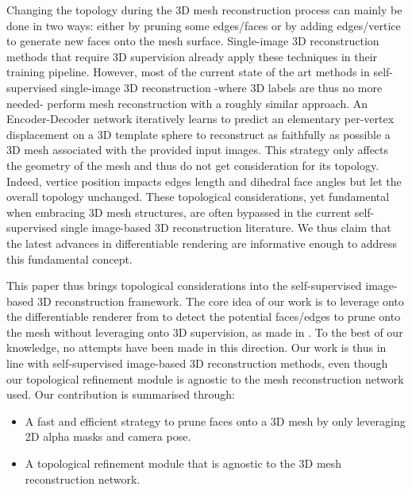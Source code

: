 Changing the topology during the 3D mesh reconstruction process can mainly be done in two ways: either by pruning some edges/faces or by adding edges/vertice to generate new faces onto the mesh surface. Single-image 3D reconstruction methods that require 3D supervision already apply these techniques in their training pipeline\citep{pan2019deep,nie2020total3dunderstanding,smith2019geometrics}. However, most of the current state of the art methods in self-supervised single-image 3D reconstruction -where 3D labels are thus no more needed- perform mesh reconstruction with a roughly similar approach. An Encoder-Decoder network iteratively learns to predict an elementary per-vertex displacement on a 3D template sphere to reconstruct as faithfully as possible a 3D mesh associated with the provided input images. This strategy only affects the geometry of the mesh and thus do not get consideration for its topology. Indeed, vertice position impacts edges length and dihedral face angles but let the overall topology unchanged. These topological considerations, yet fundamental when embracing 3D mesh structures, are often bypassed in the current self-supervised single image-based 3D reconstruction literature. We thus claim that the latest advances in differentiable rendering \citep{liu2019soft,ravi2020accelarating} are informative enough to address this fundamental concept.

This paper thus brings topological considerations into the self-supervised image-based 3D reconstruction framework. The core idea of our work is to leverage onto the differentiable renderer from \citep{ravi2020accelarating} to detect the potential faces/edges to prune onto the mesh without leveraging onto 3D supervision, as made in \citep{pan2019deep,nie2020total3dunderstanding,smith2019geometrics}. To the best of our knowledge, no attempts have been made in this direction. Our work is thus in line with self-supervised image-based 3D reconstruction methods, even though our topological refinement module is agnostic to the mesh reconstruction network used. Our contribution is summarised through: 
\begin{itemize}
    
    \item A fast and efficient strategy to prune faces onto a 3D mesh by only leveraging 2D alpha masks and camera pose. 

    \item A topological refinement module that is agnostic to the 3D mesh reconstruction network.
\end{itemize}

